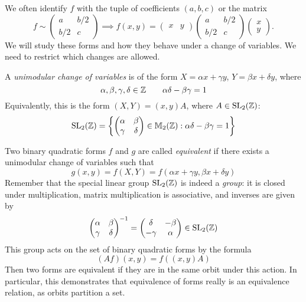 \documentclass{article}
\begin{document}
We often identify $f$ with the tuple of coefficients $(a, b, c)$ or the matrix
\[
f \sim
\begin{pmatrix}
	a & b/2 \\ b/2 & c
\end{pmatrix}
\implies
f(x, y) =
\begin{pmatrix}
	x & y
\end{pmatrix}
\begin{pmatrix}
	a & b/2 \\ b/2 & c
\end{pmatrix}
\begin{pmatrix}
	x \\ y
\end{pmatrix}.
\]
We will study these forms and how they behave under a change of variables. We need to restrict which changes are allowed.

\begin{definition}
    A \textit{unimodular change of variables} is of the form $X = \alpha x + \gamma y$, $Y = \beta x + \delta y$, where
    \[
\alpha, \beta, \gamma, \delta \in \mathbb{Z} \qquad \alpha \delta - \beta \gamma = 1
\]
Equivalently, this is the form $(X, Y) = (x, y)A$, where $A \in \mathrm{SL}_2(\mathbb{Z})$:
\[
\mathrm{SL}_2(\mathbb{Z}) = \left\lbrace \begin{pmatrix}
	\alpha & \beta \\ \gamma & \delta
\end{pmatrix} \in \mathbb{M}_2(\mathbb{Z}) : \alpha \delta - \beta \gamma = 1
  \right\rbrace
\]
\end{definition}

Two binary quadratic forms $f$ and $g$ are called \textit{equivalent} if there exists a unimodular change of variables such that
\[
g(x, y) = f(X, Y) = f(\alpha x + \gamma y, \beta x + \delta y)
\]
Remember that the special linear group $\mathrm{SL}_2(\mathbb{Z})$ is indeed a \textit{group}: it is closed under multiplication, matrix multiplication is associative, and inverses are given by
\[
\begin{pmatrix}
	\alpha & \beta \\ \gamma & \delta
\end{pmatrix}^{-1} = \begin{pmatrix}
	\delta & -\beta \\ -\gamma & \alpha
\end{pmatrix} \in \mathrm{SL}_2(\mathbb{Z})
\]
This group acts on the set of binary quadratic forms by the formula
\[
(Af)(x, y) = f((x, y)A)
\]
Then two forms are equivalent if they are in the same orbit under this action. In particular, this demonstrates that equivalence of forms really is an equivalence relation, as orbits partition a set.
\end{document}
